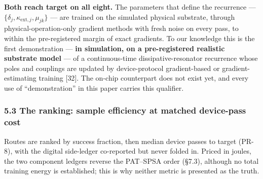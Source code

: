 \documentclass[
  10pt,
]{article}
\begin{document}
\textbf{Both reach target on all eight.} The parameters that define the
recurrence --- \(\{\delta_j, \kappa_{\text{ext},j}, \mu_{jk}\}\) --- are
trained on the simulated physical substrate, through
physical-operation-only gradient methods with fresh noise on every pass,
to within the pre-registered margin of exact gradients. To our knowledge
this is the first demonstration --- \textbf{in simulation, on a
pre-registered realistic substrate model} --- of a continuous-time
dissipative-resonator recurrence whose poles and couplings are updated
by device-protocol gradient-based or gradient-estimating training
{[}32{]}. The on-chip counterpart does not exist yet, and every use of
``demonstration'' in this paper carries this qualifier.

\subsubsection{5.3 The ranking: sample efficiency at matched device-pass
cost}\label{the-ranking-sample-efficiency-at-matched-device-pass-cost}

Routes are ranked by success fraction, then median device passes to
target (PR-8), with the digital side-ledger co-reported but never folded
in. Priced in joules, the two component ledgers reverse the PAT--SPSA
order (§7.3), although no total training energy is established; this is
why neither metric is presented as the truth.
\end{document}
